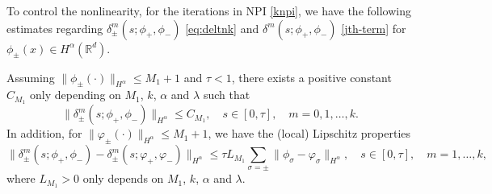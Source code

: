 \documentclass[final,leqno,showlabe]{siamltex}
\begin{document}
To control the nonlinearity, for the iterations in NPI \eqref{knpi}, we have the following estimates regarding $\delta_{\pm}^{m}(s;\phi_+,\phi_-)$ \eqref{eq:deltnk} and $\delta^{m}(s;\phi_+,\phi_-)$ \eqref{jth-term}  for $\phi_\pm(x)\in H^\alpha(\mathbb{R}^d)$.
\begin{lemma}\label{lm:nonlinear} Assuming $\|\phi_\pm(\cdot)\|_{H^\alpha}\leq M_1+1$ and $\tau<1$, there exists a positive constant $C_{M_1}$ only depending on $M_1$, $k$, $\alpha$ and $\lambda$ such that
\begin{equation}\label{eq:deltbd-1}
\|\delta_{\pm}^{m}(s;\phi_+,\phi_-)\|_{H^\alpha}\leq C_{M_1},\quad s\in [0,\tau],\quad m=0,1,\ldots,k.
\end{equation}
In addition, for $\| \varphi_\pm(\cdot)\|_{H^\alpha}\leq M_1+1$, we have the (local) Lipschitz properties
\begin{equation}\label{eq:deltlp-1}
\|\delta_{\pm}^{m}(s;\phi_+,\phi_-)-\delta_{\pm}^{m}(s;\varphi_+,\varphi_-)\|_{H^\alpha}\leq \tau L_{M_1}\sum\limits_{\sigma=\pm}\|\phi_\sigma-\varphi_\sigma\|_{H^\alpha},\quad s\in [0,\tau],\quad
m=1,\ldots,k,
\end{equation}
where $L_{M_1}>0$ only depends on $M_1$, $k$, $\alpha$ and $\lambda$.
\end{lemma}
\end{document}
